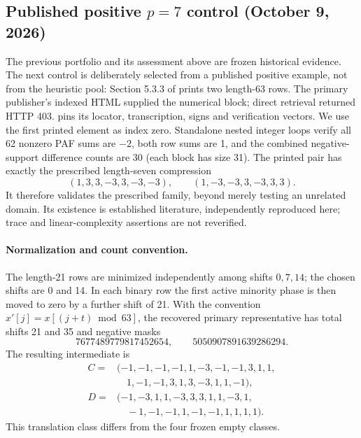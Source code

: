 \documentclass[11pt]{article}
\begin{document}


\subsection{Published positive $p=7$ control (October 9, 2026)}
The previous portfolio and its assessment above are frozen historical evidence.
The next control is deliberately selected from a published positive example,
not from the heuristic pool: Section 5.3.3 of \cite{issac} prints two length-63
rows. The primary publisher's indexed HTML supplied the numerical block;
direct retrieval returned HTTP 403. 
pins its locator, transcription, signs and verification vectors. We use the
first printed element as index zero. Standalone nested integer loops verify
all 62 nonzero PAF sums are $-2$, both row sums are 1, and the combined
negative-support difference counts are 30 (each block has size 31).
The printed pair has exactly the prescribed length-seven compression
\[
(1,3,3,-3,3,-3,-3),\qquad(1,-3,-3,3,-3,3,3).
\]
It therefore validates the prescribed family, beyond merely testing an
unrelated domain. Its existence is established literature, independently
reproduced here; trace and linear-complexity assertions are not reverified.

\paragraph{Normalization and count convention.}
The length-21 rows are minimized independently among shifts $0,7,14$;
the chosen shifts are 0 and 14. In each binary row the first active minority
phase is then moved to zero by a further shift of 21. With the convention
$x'[j]=x[(j+t)\bmod63]$, the recovered primary representative has total
shifts 21 and 35 and negative masks
\[
7677489779817452654,\qquad 5050907891639286294.
\]
The resulting intermediate is
\begin{align*}
C={}&(-1,-1,-1,-1,1,-3,-1,-1,3,1,1,\\
 &\hspace{1em}1,-1,-1,3,1,3,-3,1,1,-1),\\
D={}&(-1,-3,1,1,-3,3,3,1,1,-3,1,\\
 &\hspace{1em}-1,-1,-1,1,-1,-1,1,1,1,1).
\end{align*}
This translation class differs from the four frozen empty classes.
\end{document}
